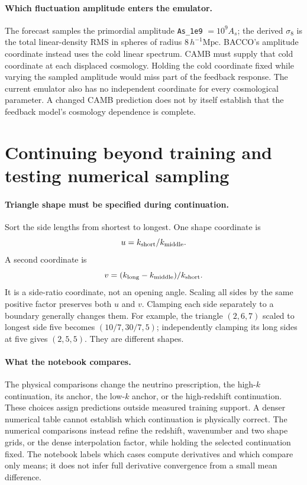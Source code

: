 \documentclass[11pt]{article}
\newcommand{\us}{\_\allowbreak}
\begin{document}
\paragraph{Which fluctuation amplitude enters the emulator.}
The forecast samples the primordial amplitude \texttt{As\us 1e9}
$=10^9A_s$; the derived $\sigma_8$ is the total linear-density RMS in
spheres of radius $8\,h^{-1}\mathrm{Mpc}$. BACCO's amplitude coordinate
instead uses the cold linear spectrum. CAMB must supply that cold
coordinate at each displaced cosmology. Holding the cold coordinate fixed
while varying the sampled amplitude would miss part of the feedback
response. The current emulator also has
no independent coordinate for every cosmological parameter. A changed
CAMB prediction does not by itself establish that the feedback model's
cosmology dependence is complete.

\section{Continuing beyond training and testing numerical sampling}
\paragraph{Triangle shape must be specified during continuation.}
Sort the side lengths from shortest to longest. One shape coordinate is
\begin{equation}
 u=k_{\rm short}/k_{\rm middle}.
\end{equation}
A second coordinate is
\begin{equation}
 v=(k_{\rm long}-k_{\rm middle})/k_{\rm short}.
\end{equation}
It is a side-ratio coordinate, not an opening angle. Scaling all sides by
the same positive factor preserves both $u$ and $v$. Clamping each side
separately to a boundary generally changes them. For example, the triangle
$(2,6,7)$ scaled to longest side five becomes $(10/7,30/7,5)$; independently
clamping its long sides at five gives $(2,5,5)$. They are different shapes.

\paragraph{What the notebook compares.}
The physical comparisons change the neutrino prescription, the high-$k$
continuation, its anchor, the low-$k$ anchor, or the high-redshift
continuation. These choices assign predictions outside measured training
support. A denser numerical table cannot establish which continuation is
physically correct. The numerical comparisons instead refine the redshift,
wavenumber and two shape grids, or the dense interpolation factor, while
holding the selected continuation fixed. The notebook labels which cases
compute derivatives and which compare only means; it does not infer
full derivative convergence from a small mean difference.
\end{document}
